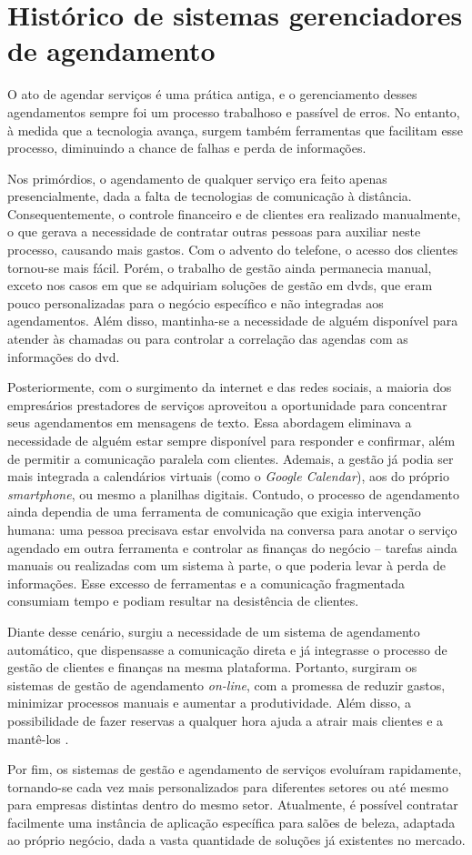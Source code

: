 \section{Histórico de sistemas gerenciadores de agendamento}

O ato de agendar serviços é uma prática antiga, e o gerenciamento desses agendamentos sempre foi um processo trabalhoso e passível de erros. No entanto, à medida que a tecnologia avança, surgem também ferramentas que facilitam esse processo, diminuindo a chance de falhas e perda de informações.

Nos primórdios, o agendamento de qualquer serviço era feito apenas presencialmente, dada a falta de tecnologias de comunicação à distância. Consequentemente, o controle financeiro e de clientes era realizado manualmente, o que gerava a necessidade de contratar outras pessoas para auxiliar neste processo, causando mais gastos. Com o advento do telefone, o acesso dos clientes tornou-se mais fácil. Porém, o trabalho de gestão ainda permanecia manual, exceto nos casos em que se adquiriam soluções de gestão em \gls{dvd}s, que eram pouco personalizadas para o negócio específico e não integradas aos agendamentos. Além disso, mantinha-se a necessidade de alguém disponível para atender às chamadas ou para controlar a correlação das agendas com as informações do \gls{dvd}.

Posteriormente, com o surgimento da internet e das redes sociais, a maioria dos empresários prestadores de serviços aproveitou a oportunidade para concentrar seus agendamentos em mensagens de texto. Essa abordagem eliminava a necessidade de alguém estar sempre disponível para responder e confirmar, além de permitir a comunicação paralela com clientes. Ademais, a gestão já podia ser mais integrada a calendários virtuais (como o \emph{Google Calendar}), aos do próprio \emph{smartphone}, ou mesmo a planilhas digitais. Contudo, o processo de agendamento ainda dependia de uma ferramenta de comunicação que exigia intervenção humana: uma pessoa precisava estar envolvida na conversa para anotar o serviço agendado em outra ferramenta e controlar as finanças do negócio – tarefas ainda manuais ou realizadas com um sistema à parte, o que poderia levar à perda de informações. Esse excesso de ferramentas e a comunicação fragmentada consumiam tempo e podiam resultar na desistência de clientes.

Diante desse cenário, surgiu a necessidade de um sistema de agendamento automático, que dispensasse a comunicação direta e já integrasse o processo de gestão de clientes e finanças na mesma plataforma. Portanto, surgiram os sistemas de gestão de agendamento \emph{on-line}, com a promessa de reduzir gastos, minimizar processos manuais e aumentar a produtividade. Além disso, a possibilidade de fazer reservas a qualquer hora ajuda a atrair mais clientes e a mantê-los \cite{reservio}.

Por fim, os sistemas de gestão e agendamento de serviços evoluíram rapidamente, tornando-se cada vez mais personalizados para diferentes setores ou até mesmo para empresas distintas dentro do mesmo setor. Atualmente, é possível contratar facilmente uma instância de aplicação específica para salões de beleza, adaptada ao próprio negócio, dada a vasta quantidade de soluções já existentes no mercado.